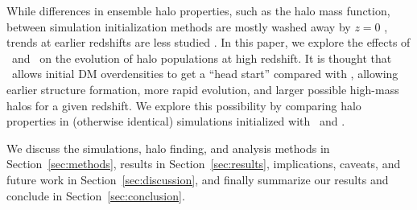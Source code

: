 

While differences in ensemble halo properties, such as the halo mass function, between simulation initialization methods are mostly washed away by $z=0$ \citep{1998MNRAS.299.1097S}, trends at earlier redshifts are less studied \citep{2007ApJ...671.1160L}.  In this paper, we explore the effects of \za\ and \lpt\ on the evolution of halo populations at high redshift.  It is thought that \lpt\ allows initial DM overdensities to get a ``head start'' compared with \za, allowing earlier structure formation, more rapid evolution, and larger possible high-mass halos for a given redshift.  We explore this possibility by comparing halo properties in (otherwise identical) simulations initialized with \za\ and \lpt.

We discuss the simulations, halo finding, and analysis methods in Section~\ref{sec:methods}, results in Section~\ref{sec:results}, implications, caveats, and future work in Section~\ref{sec:discussion}, and finally summarize our results and conclude in Section~\ref{sec:conclusion}.




